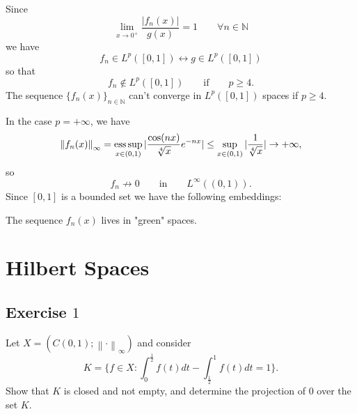 \documentclass[a4paper, twoside, openany]{book}
\newcommand{\norm}[1]{\left\lVert#1\right\rVert}
\newcommand{\esssup}{\operatornamewithlimits{ess\,sup}}
\begin{document}
Since
$$\lim_{x \rightarrow 0^+} \frac{|f_n(x)|}{g(x)} = 1 \qquad \forall n \in \mathbb{N}$$
we have
$$f_n \in L^p([0, 1]) \leftrightarrow g \in L^p([0, 1])$$
so that
$$f_n \notin L^p([0, 1]) \qquad \textrm{if} \qquad p \geq 4.$$
The sequence $\{ f_n(x) \}_{n \in \mathbb{N}}$ can't converge in $L^p([0, 1])$ spaces if $p \geq 4$. \par 
In the case $p = +\infty$, we have
$$\norm{f_n(x)}_{\infty} = \esssup_{x \in (0, 1)} |\frac{\cos(nx)}{\sqrt[4]{x}}e^{-nx}| \leq \sup_{x \in (0,1)} |\frac{1}{\sqrt[4]{x}}| \rightarrow +\infty,$$
so
$$f_n \nrightarrow 0 \qquad \textrm{in} \qquad L^{\infty}((0, 1)).$$		
Since $[0, 1]$ is a bounded set we have the following embeddings:	
\begin{figure}[!ht]
\begin{center}
\end{center}
\end{figure}							
The sequence $f_n(x)$ lives in "green" spaces.

\chapter{Hilbert Spaces}
\section*{Exercise $1$}
Let $X = (C(0,1); \norm{ \cdot }_{\infty})$ and consider
$$K = \{ f \in X : \int_0^{\frac{1}{2}} f(t) dt - \int_{\frac{1}{2}}^1 f(t) dt = 1 \}.$$
Show that $K$ is closed and not empty, and determine the projection of $0$ over the set $K$.
\end{document}
